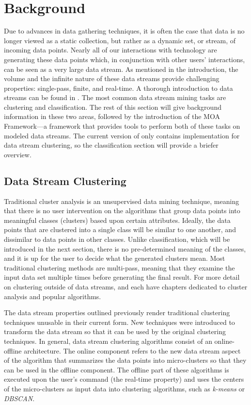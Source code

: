 \documentclass[nojss]{jss}
\begin{document}
\section{Background}
\label{sec:background}

Due to advances in data gathering techniques, it is often the case that data is no longer viewed as a static collection, but rather as a dynamic set, or stream, of incoming data points. Nearly all of our interactions with technology are generating these data points which, in conjunction with other users’ interactions, can be seen as a very large data stream. As mentioned in the introduction, the volume and the infinite nature of these data streams provide challenging properties: single-pass, finite, and real-time. A thorough introduction to data streams can be found in \cite{stream:Aggarwal:2007} . The most common data stream mining tasks are clustering and classification. The rest of this section will give background information in these two areas, followed by the introduction of the MOA Framework—a framework that provides tools to perform both of these tasks on modeled data streams. The current version of  only contains implementation for data stream clustering, so the classification section will provide a briefer overview.

\subsection{Data Stream Clustering}
\label{sec:background:dsc}

Traditional cluster analysis is an unsupervised data mining technique, meaning that there is no user intervention on the algorithms that group data points into meaningful classes (clusters) based upon certain attributes. Ideally, the data points that are clustered into a single class will be similar to one another, and dissimilar to data points in other classes. Unlike classification, which will be introduced in the next section, there is no pre-determined meaning of the classes, and it is up for the user to decide what the generated clusters mean. Most traditional clustering methods are multi-pass, meaning that they examine the input data set multiple times before generating the final result. For more detail on clustering outside of data streams, \citep{stream:Dunham:2002} and \citep{stream:Tan+Steinbach+Kumar:2006} each have chapters dedicated to cluster analysis and popular algorithms.


The data stream properties outlined previously render traditional clustering techniques unusable in their current form. New techniques were introduced to transform the data stream so that it can be used by the original clustering techniques. In general, data stream clustering algorithms consist of an online-offline architecture. The online component refers to the new data stream aspect of the algorithm that summarizes the data points into micro-clusters so that they can be used in the offline component. The offline part of these algorithms is executed upon the user’s command (the real-time property) and uses the centers of the micro-clusters as input data into clustering algorithms, such as \textit{k-means} or \textit{DBSCAN}. 
\end{document}
